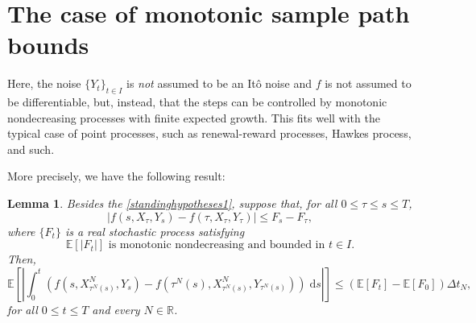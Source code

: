 \documentclass[reqno,12pt]{amsart}
\theoremstyle{plain}%
\newtheorem{lem}{Lemma}[section]
\theoremstyle{definition}
\begin{document}
\section{The case of monotonic sample path bounds}
\label{secmonotonicbound}

Here, the noise $\{Y_t\}_{t\in I}$ is \emph{not} assumed to be an It\^o noise and $f$ is not assumed to be differentiable, but, instead, that the steps can be controlled by monotonic nondecreasing processes with finite expected growth. This fits well with the typical case of point processes, such as renewal-reward processes, Hawkes process, and such.

More precisely, we have the following result:

\begin{lem}
    \label{lemmonotonicbound}
    Besides the \cref{standinghypotheses1}, suppose that, for all $0 \leq \tau \leq s \leq T$,
    \begin{equation}
        \label{stepbound}
          |f(s, X_\tau, Y_s) - f(\tau, X_\tau, Y_\tau)| \leq F_s - F_\tau,
      \end{equation}
      where $\{F_t\}$ is a real stochastic process satisfying
      \begin{equation}
        \label{expectstepmonotonic}
        \mathbb{E}[|F_t|] \textrm{ is monotonic nondecreasing and bounded in } t\in I.
      \end{equation}
      Then,
      \begin{equation}
        \label{expectintfboundbyG}
          \mathbb{E}\left[\left|\int_0^t \left( f(s, X_{\tau^N(s)}^N, Y_s) - f(\tau^N(s), X_{\tau^N(s)}^N, Y_{\tau^N(s)}) \right)\;\mathrm{d}s\right|\right] \leq (\mathbb{E}[F_t] - \mathbb{E}[F_0])\Delta t_N,
      \end{equation}
      for all $0 \leq t \leq T$ and every $N\in \mathbb{R}$.
\end{lem}
\end{document}
